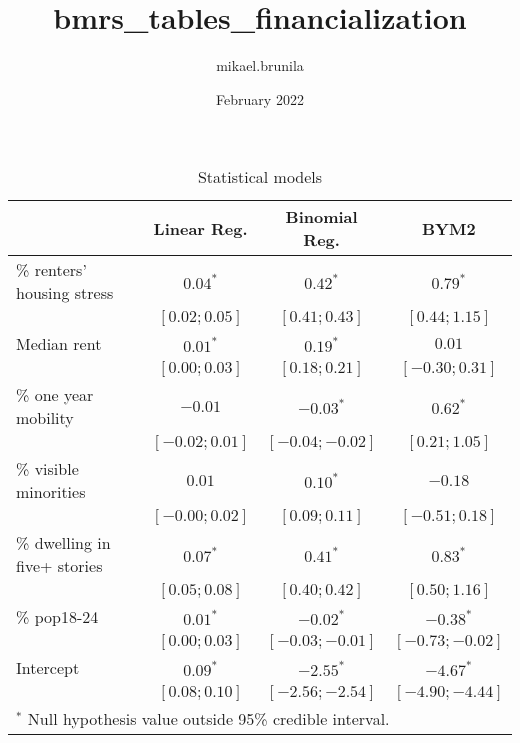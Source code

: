 \documentclass{article}
\title{bmrs_tables_financialization}
\author{mikael.brunila }
\date{February 2022}
\begin{document}
\begin{table}
\begin{center}
\begin{tabular}{l c c c}
\hline
 & Linear Reg. & Binomial Reg. & BYM2 \\
\hline
\% renters' housing stress   & $0.04^{*}$       & $0.42^{*}$        & $0.79^{*}$        \\
                             & $ [ 0.02; 0.05]$ & $ [ 0.41;  0.43]$ & $ [ 0.44;  1.15]$ \\
Median rent                  & $0.01^{*}$       & $0.19^{*}$        & $0.01$            \\
                             & $ [ 0.00; 0.03]$ & $ [ 0.18;  0.21]$ & $ [-0.30;  0.31]$ \\
\% one year mobility         & $-0.01$          & $-0.03^{*}$       & $0.62^{*}$        \\
                             & $ [-0.02; 0.01]$ & $ [-0.04; -0.02]$ & $ [ 0.21;  1.05]$ \\
\% visible minorities        & $0.01$           & $0.10^{*}$        & $-0.18$           \\
                             & $ [-0.00; 0.02]$ & $ [ 0.09;  0.11]$ & $ [-0.51;  0.18]$ \\
\% dwelling in five+ stories & $0.07^{*}$       & $0.41^{*}$        & $0.83^{*}$        \\
                             & $ [ 0.05; 0.08]$ & $ [ 0.40;  0.42]$ & $ [ 0.50;  1.16]$ \\
\% pop18-24                  & $0.01^{*}$       & $-0.02^{*}$       & $-0.38^{*}$       \\
                             & $ [ 0.00; 0.03]$ & $ [-0.03; -0.01]$ & $ [-0.73; -0.02]$ \\
Intercept                    & $0.09^{*}$       & $-2.55^{*}$       & $-4.67^{*}$       \\
                             & $ [ 0.08; 0.10]$ & $ [-2.56; -2.54]$ & $ [-4.90; -4.44]$ \\
\hline
\multicolumn{4}{l}{\scriptsize{$^*$ Null hypothesis value outside 95\% credible interval.}}
\end{tabular}
\caption{Statistical models}
\label{table:coefficients}
\end{center}
\end{table}
\end{document}
